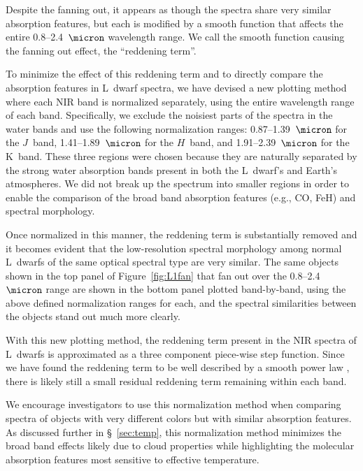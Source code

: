 \documentclass[12pt,preprint]{aastex}
\begin{document}
Despite the fanning out, it appears as though the spectra share very similar absorption features, but each is modified by a smooth function that affects the entire 0.8--2.4~$\micron$ wavelength range. 
We call the smooth function causing the fanning out effect, the ``reddening term''.

To minimize the effect of this reddening term and to directly compare the absorption features in L~dwarf spectra, we have devised a new plotting method where each NIR band is normalized separately, using the entire wavelength range of each band. 
Specifically, we exclude the noisiest parts of the spectra in the water bands and use the following normalization ranges: 0.87--1.39~$\micron$ for the $J$~band, 1.41--1.89~$\micron$ for the $H$~band, and 1.91--2.39~$\micron$ for the K~band.
These three regions were chosen because they are naturally separated by the strong water absorption bands present in both the L~dwarf's and Earth's atmospheres. We did not break up the spectrum into smaller regions in order to enable the comparison of the broad band absorption features (e.g., CO, FeH) and spectral morphology.

Once normalized in this manner, the reddening term is substantially removed and it becomes evident that the low-resolution spectral morphology among normal L~dwarfs of the same optical spectral type are very similar. 
The same objects shown in the top panel of Figure~\ref{fig:L1fan} that fan out over the 0.8--2.4~$\micron$ range are shown in the bottom panel plotted band-by-band, using the above defined normalization ranges for each, and the spectral similarities between the objects stand out much more clearly.

With this new plotting method, the reddening term present in the NIR spectra of L~dwarfs is approximated as a three component piece-wise step function. Since we have found the reddening term to be well described by a smooth power law \citep[in prep.]{Hiranaka13}, there is likely still a small residual reddening term remaining within each band.

We encourage investigators to use this normalization method when comparing spectra of objects with very different colors but with similar absorption features. As discussed further in \S~\ref{sec:temp}, this normalization method minimizes the broad band effects likely due to cloud properties while highlighting the molecular absorption features most sensitive to effective temperature. 
\end{document}
